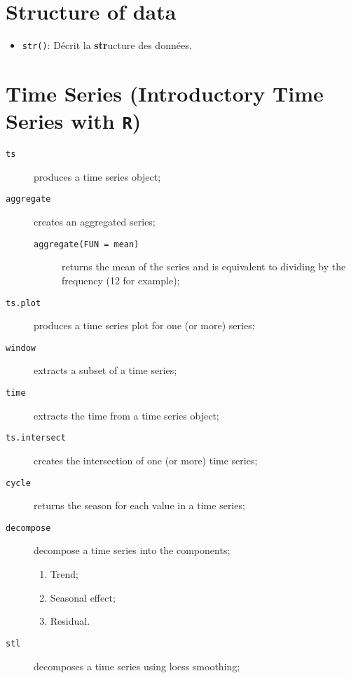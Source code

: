 \documentclass[10pt, french]{article}
\begin{document}
\raggedcolumns
\begin{multicols*}{2}
\section*{Structure of data}
\begin{itemize}
	\item	\texttt{str()}: Décrit la \textbf{str}ucture des données.
\end{itemize}

\section*{Time Series (Introductory Time Series with \texttt{R})}
\begin{distributions}
\begin{description}
	\item[\texttt{ts}]	produces a time series object;
	\item[\texttt{aggregate}]	creates an aggregated series;
		\begin{description}
		\item[\texttt{aggregate(FUN = mean)}]	returns the mean of the series and is equivalent to dividing by the frequency (12 for example);
		\end{description}
	\item[\texttt{ts.plot}]	produces a time series plot for one (or more) series;
	\item[\texttt{window}]	extracts a subset of a time series;
	\item[\texttt{time}]	extracts the time from a time series object;
	\item[\texttt{ts.intersect}]	creates the intersection of one (or more) time series;
	\item[\texttt{cycle}]	returns the season for each value in a time series;
	\item[\texttt{decompose}]	decompose a time series into the components;
		\begin{enumerate}
		\item	Trend;
		\item	Seasonal effect;
		\item	Residual.
		\end{enumerate}
	\item[\texttt{stl}]	decomposes a time series using loess smoothing;
\end{description}
\end{distributions}


\end{multicols*}
\end{document}
